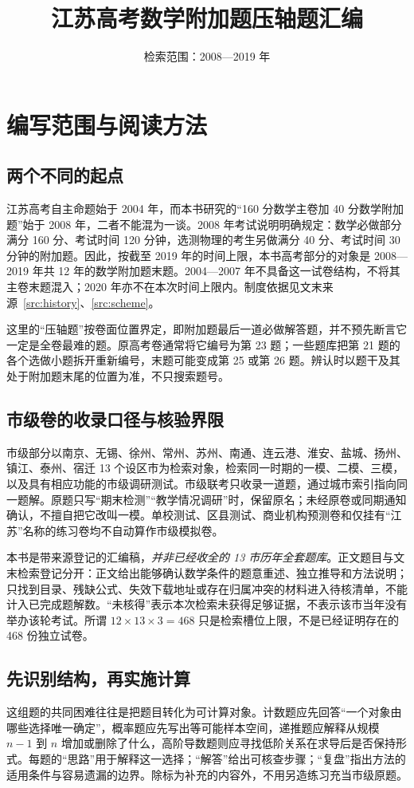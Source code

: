 \documentclass[UTF8,12pt,a4paper,fontset=fandol]{ctexart}
\title{江苏高考数学附加题压轴题汇编}
\author{}
\date{检索范围：2008—2019 年}
\begin{document}
\maketitle
\tableofcontents

\section{编写范围与阅读方法}\label{sec:intro}
\subsection{两个不同的起点}
江苏高考自主命题始于 2004 年，而本书研究的“160 分数学主卷加 40 分数学附加题”始于 2008 年，二者不能混为一谈。2008 年考试说明明确规定：数学必做部分满分 160 分、考试时间 120 分钟，选测物理的考生另做满分 40 分、考试时间 30 分钟的附加题。因此，按截至 2019 年的时间上限，本书高考部分的对象是 2008—2019 年共 12 年的数学附加题末题。2004—2007 年不具备这一试卷结构，不将其主卷末题混入；2020 年亦不在本次时间上限内。制度依据见文末来源~\ref{src:history}、\ref{src:scheme}。

这里的“压轴题”按卷面位置界定，即附加题最后一道必做解答题，并不预先断言它一定是全卷最难的题。原高考卷通常将它编号为第 23 题；一些题库把第 21 题的各个选做小题拆开重新编号，末题可能变成第 25 或第 26 题。辨认时以题干及其处于附加题末尾的位置为准，不只搜索题号。

\subsection{市级卷的收录口径与核验界限}
市级部分以南京、无锡、徐州、常州、苏州、南通、连云港、淮安、盐城、扬州、镇江、泰州、宿迁 13 个设区市为检索对象，检索同一时期的一模、二模、三模，以及具有相应功能的市级调研测试。市级联考只收录一道题，通过城市索引指向同一题解。原题只写“期末检测”“教学情况调研”时，保留原名；未经原卷或同期通知确认，不擅自把它改叫一模。单校测试、区县测试、商业机构预测卷和仅挂有“江苏”名称的练习卷均不自动算作市级模拟卷。

本书是带来源登记的汇编稿，\emph{并非已经收全的 13 市历年全套题库}。正文题目与文末检索登记分开：正文给出能够确认数学条件的题意重述、独立推导和方法说明；只找到目录、残缺公式、失效下载地址或存在归属冲突的材料进入待核清单，不能计入已完成题解数。“未核得”表示本次检索未获得足够证据，不表示该市当年没有举办该轮考试。所谓 $12\times13\times3=468$ 只是检索槽位上限，不是已经证明存在的 468 份独立试卷。

\subsection{先识别结构，再实施计算}
这组题的共同困难往往是把题目转化为可计算对象。计数题应先回答“一个对象由哪些选择唯一确定”，概率题应先写出等可能样本空间，递推题应解释从规模 $n-1$ 到 $n$ 增加或删除了什么，高阶导数题则应寻找低阶关系在求导后是否保持形式。每题的“思路”用于解释这一选择；“解答”给出可核查步骤；“复盘”指出方法的适用条件与容易遗漏的边界。除标为补充的内容外，不用另造练习充当市级原题。
\end{document}
